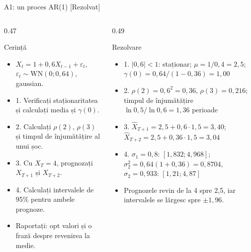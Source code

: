 \begin{frame}{A1: un proces AR(1) [Rezolvat]}
\itemsize{\scriptsize}
\begin{columns}[T]
\begin{column}{0.47\textwidth}
\begin{block}{Cerință}
\begin{itemize}
    \item $X_t = 1 + 0{,}6X_{t-1} + \varepsilon_t$, $\varepsilon_t \sim \mathrm{WN}(0; 0{,}64)$, gaussian.
    \item 1. Verificați staționaritatea și calculați media și $\gamma(0)$.
    \item 2. Calculați $\rho(2)$, $\rho(3)$ și timpul de înjumătățire al unui șoc.
    \item 3. Cu $X_T = 4$, prognozați $X_{T+1}$ și $X_{T+2}$.
    \item 4. Calculați intervalele de 95\% pentru ambele prognoze.
    \item Raportați: opt valori și o frază despre revenirea la medie.
\end{itemize}
\end{block}
\end{column}
\begin{column}{0.49\textwidth}
\begin{exampleblock}{Rezolvare}
\begin{itemize}
    \item 1. $|0{,}6| < 1$: staționar; $\mu = 1/0{,}4 = 2{,}5$; $\gamma(0) = 0{,}64/(1 - 0{,}36) = 1{,}00$
    \item 2. $\rho(2) = 0{,}6^2 = 0{,}36$, $\rho(3) = 0{,}216$; timpul de înjumătățire $\ln 0{,}5/\ln 0{,}6 = 1{,}36$ perioade
    \item 3. $\hat X_{T+1} = 2{,}5 + 0{,}6 \cdot 1{,}5 = 3{,}40$; $\hat X_{T+2} = 2{,}5 + 0{,}36 \cdot 1{,}5 = 3{,}04$
    \item 4. $\sigma_1 = 0{,}8$: $[1{,}832; 4{,}968]$; $\sigma_2^2 = 0{,}64(1 + 0{,}36) = 0{,}8704$, $\sigma_2 = 0{,}933$: $[1{,}21; 4{,}87]$
    \item Prognozele revin de la 4 spre 2,5, iar intervalele se lărgesc spre $\pm 1{,}96$.
\end{itemize}
\end{exampleblock}
\end{column}
\end{columns}
\end{frame}

